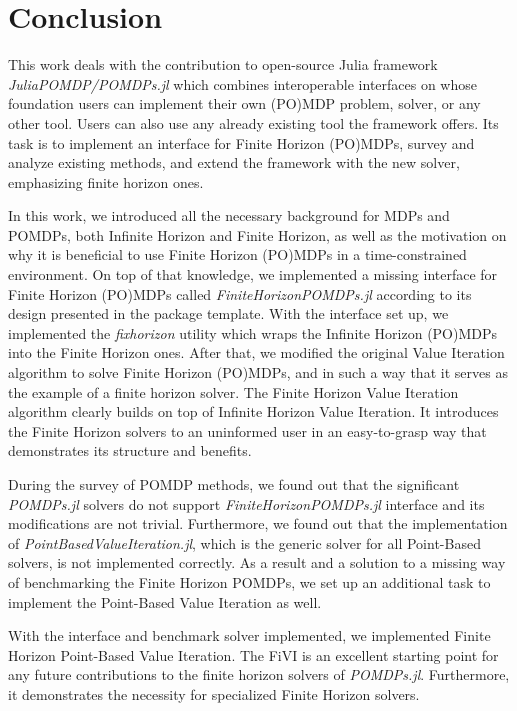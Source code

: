 
\chapter{Conclusion}

This work deals with the contribution to open-source Julia framework \textit{JuliaPOMDP/POMDPs.jl} which combines interoperable interfaces on whose foundation users can implement their own (PO)MDP problem, solver, or any other tool. Users can also use any already existing tool the framework offers. Its task is to implement an interface for Finite Horizon (PO)MDPs, survey and analyze existing methods, and extend the framework with the new solver, emphasizing finite horizon ones.

In this work, we introduced all the necessary background for MDPs and POMDPs, both Infinite Horizon and Finite Horizon, as well as the motivation on why it is beneficial to use Finite Horizon (PO)MDPs in a time-constrained environment. On top of that knowledge, we implemented a missing interface for Finite Horizon (PO)MDPs called \textit{FiniteHorizonPOMDPs.jl} according to its design presented in the package template. With the interface set up, we implemented the \textit{fixhorizon} utility which wraps the Infinite Horizon (PO)MDPs into the Finite Horizon ones. After that, we modified the original Value Iteration algorithm to solve Finite Horizon (PO)MDPs, and in such a way that it serves as the example of a finite horizon solver. The Finite Horizon Value Iteration algorithm clearly builds on top of Infinite Horizon Value Iteration. It introduces the Finite Horizon solvers to an uninformed user in an easy-to-grasp way that demonstrates its structure and benefits.

During the survey of POMDP methods, we found out that the significant \textit{POMDPs.jl} solvers do not support \textit{FiniteHorizonPOMDPs.jl} interface and its modifications are not trivial. Furthermore, we found out that the implementation of \textit{PointBasedValueIteration.jl}, which is the generic solver for all Point-Based solvers, is not implemented correctly. As a result and a solution to a missing way of benchmarking the Finite Horizon POMDPs, we set up an additional task to implement the Point-Based Value Iteration as well. 

With the interface and benchmark solver implemented, we implemented Finite Horizon Point-Based Value Iteration. The FiVI is an excellent starting point for any future contributions to the finite horizon solvers of \textit{POMDPs.jl}. Furthermore, it demonstrates the necessity for specialized Finite Horizon solvers.

